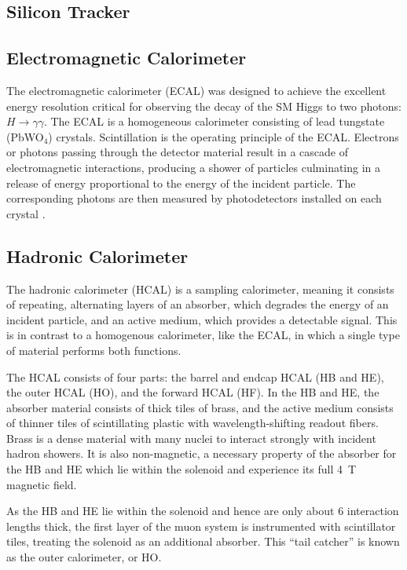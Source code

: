 \subsection{Silicon Tracker}

\subsection{Electromagnetic Calorimeter}
The electromagnetic calorimeter (ECAL) was designed to achieve the excellent energy resolution critical for observing the decay of the SM Higgs to two photons: $H \to \gamma\gamma$.
The ECAL is a homogeneous calorimeter consisting of lead tungstate (PbWO$_4$) crystals.
Scintillation is the operating principle of the ECAL.
Electrons or photons passing through the detector material result in a cascade of electromagnetic interactions, producing a shower of particles culminating in a release of energy proportional to the energy of the incident particle.
The corresponding photons are then measured by photodetectors installed on each crystal \cite{CERN-LHCC-97-033, Fabjan:692252}.

\subsection{Hadronic Calorimeter}
The hadronic calorimeter (HCAL) is a sampling calorimeter, meaning it consists of repeating, alternating layers of an absorber, which degrades the energy of an incident particle, and an active medium, which provides a detectable signal.
This is in contrast to a homogenous calorimeter, like the ECAL, in which a single type of material performs both functions.

The HCAL consists of four parts: the barrel and endcap HCAL (HB and HE), the outer HCAL (HO), and the forward HCAL (HF).
In the HB and HE, the absorber material consists of thick tiles of brass, and the active medium consists of thinner tiles of scintillating plastic with wavelength-shifting readout fibers.
Brass is a dense material with many nuclei to interact strongly with incident hadron showers.
It is also non-magnetic, a necessary property of the absorber for the HB and HE which lie within the solenoid and experience its full 4~T magnetic field.

As the HB and HE lie within the solenoid and hence are only about 6 interaction lengths thick, the first layer of the muon system is instrumented with scintillator tiles, treating the solenoid as an additional absorber.
This ``tail catcher'' is known as the outer calorimeter, or HO.

